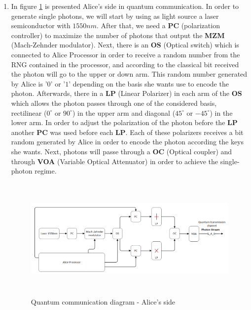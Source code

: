 \begin{enumerate}
  \item In figure \ref{quantumchannelcommunication1} is presented Alice's side in quantum communication. In order to generate single photons, we will start by using as light source a laser semiconductor with $1550nm$. After that, we need a \textbf{PC} (polarization controller) to maximize the number of photons that output the \textbf{MZM} (Mach-Zehnder modulator). Next, there is an \textbf{OS} (Optical switch) which is connected to Alice Processor in order to receive a random number from the RNG contained in the processor, and according to the classical bit received the photon will go to the upper or down arm. This random number generated by Alice is '$0$' or '$1$' depending on the basis she wants use to encode the photon. Afterwards, there in a \textbf{LP} (Linear Polarizer) in each arm of the \textbf{OS} which allows the photon passes through one of the considered basis, rectilinear ($0^{\circ}$ or $90^{\circ}$) in the upper arm and diagonal ($45^{\circ}$ or $-45^{\circ}$) in the lower arm. In order to adjust the polarization of the photon before the \textbf{LP} another \textbf{PC} was used before each \textbf{LP}. Each of these polarizers receives a bit random generated by Alice in order to encode the photon according the keys she wants. Next, photons will passe through a \textbf{OC} (Optical coupler) and through \textbf{VOA} (Variable Optical Attenuator) in order to achieve the single-photon regime.

        \begin{figure}[H]
        	\centering \includegraphics[width=1.1\textwidth,height=6cm]{./sdf/ot_with_discrete_variables/figures/experimental_alice.png}
        	\caption{Quantum communication diagram - Alice's side}\label{quantumchannelcommunication1}
        \end{figure}


\end{enumerate}
